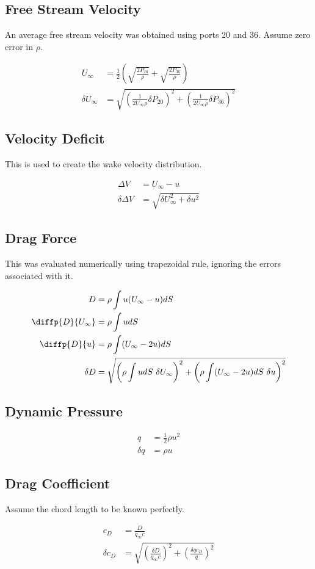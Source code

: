\documentclass[runningheads]{llncs}
\begin{document}
\subsection{Free Stream Velocity}

An average free stream velocity was obtained using ports 20 and 36. Assume zero error in $\rho$.

\begin{align*}
    U_\infty &= \frac{1}{2} \left(\sqrt{\frac{2 P_{20}}{\rho}} + \sqrt{\frac{2 P_{36}}{\rho}} \right) \\
    \delta U_\infty &= \sqrt{\left(\frac{1}{2U_\infty \rho} \delta P_{20}\right)^2 + \left(\frac{1}{2U_\infty \rho } \delta P_{36}\right)^2}
\end{align*}

\subsection{Velocity Deficit}

This is used to create the wake velocity distribution.

\begin{align*}
    \Delta V &= U_\infty - u\\
    \delta \Delta V &= \sqrt{\delta U_\infty^2 + \delta u^2}
\end{align*}

\subsection{Drag Force}

This was evaluated numerically using trapezoidal rule, ignoring the errors associated with it.

\begin{align*}
    D &= \rho\int u (U_\infty - u) dS\\
    \diffp{D}{{U_\infty}} &= \rho \int  u dS\\
    \diffp{D}{u} &= \rho \int (U_\infty - 2u) dS\\
    \delta D &= \sqrt{\left(\rho \int  u dS \ \delta U_\infty \right)^2 + \left(\rho \int (U_\infty - 2u) dS \ \delta u \right)^2}
\end{align*}

\subsection{Dynamic Pressure}

\begin{align*}
    q &= \frac{1}{2} \rho u^2\\
    \delta q &= \rho u
\end{align*}

\subsection{Drag Coefficient}

Assume the chord length to be known perfectly.

\begin{align*}
    c_D &= \frac{D}{q_\infty c}\\
    \delta c_D &= \sqrt{\left(\frac{\delta D}{q_\infty c}\right)^2 + \left( \frac{\delta q c_D}{q} \right)^2}
\end{align*}
\end{document}
